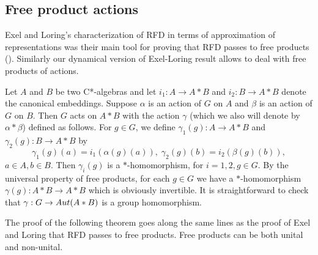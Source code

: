 \documentclass[11 pt, leqno, hidelinks]{amsart}%
\theoremstyle{plain}
\numberwithin{equation}{section}
\begin{document}
\bigskip

\subsection{Free product actions} \label{subsec:free}

Exel and Loring's characterization of RFD in terms of approximation of representations was their main tool for proving that RFD passes to free products (\cite{ExelLoring}). Similarly our dynamical version of Exel-Loring result allows to deal with free products of actions.

Let $A$ and $B$ be two C*-algebras and let $i_1: A \to A\ast B$ and $i_2: B \to A\ast B$ denote the canonical embeddings. Suppose $\alpha$ is an action of $G$ on $A$ and $\beta$ is an action of $G$ on $B$.  Then $G$ acts on $A\ast B$ with the action $\gamma$ (which we also will denote by $\alpha \ast \beta$) defined as follows.
For $g\in G$, we define $\gamma_1(g): A \to A\ast B$ and $\gamma_2(g): B \to A\ast B$ by
$$\gamma_1(g)(a) = i_1(\alpha(g)(a)), \; \gamma_2(g)(b) = i_2(\beta(g)(b)),$$
$a\in A, b\in B$. Then $\gamma_i(g)$ is a $\ast$-homomorphism, for $i=1, 2, g\in G$. By the universal property of free products, for each $g\in G$ we have a $\ast$-homomorphism $\gamma(g): A \ast B \to A\ast B$ which is obviously invertible. It is straightforward to check that $\gamma: G \to \textup{Aut} (A\ast B)$ is a group homomorphism.

\medskip

The proof of the following theorem goes along the same lines as the proof of Exel and Loring that RFD passes to free products. Free products can be both unital and non-unital.
\end{document}
